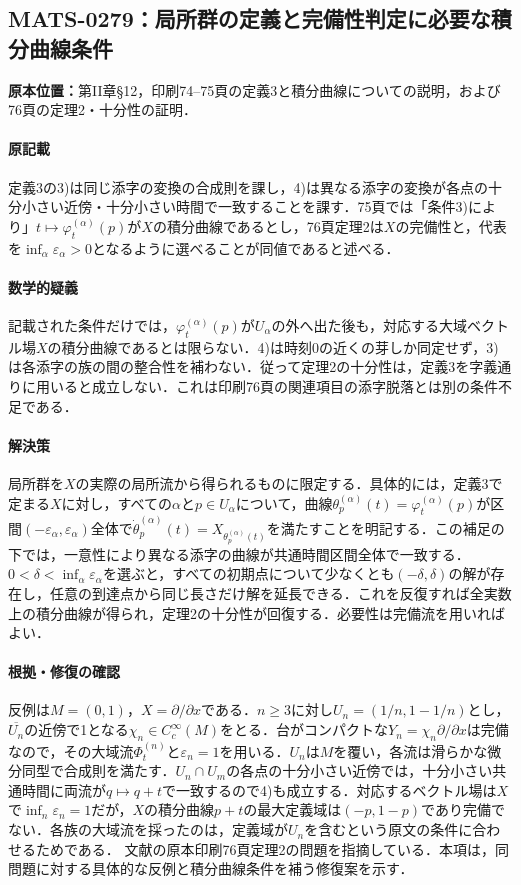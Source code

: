 \documentclass[a4paper,10pt]{ltjsarticle}
\begin{document}
\subsection*{MATS-0279：局所群の定義と完備性判定に必要な積分曲線条件}\label{math:MATS-0279}
\noindent\textbf{原本位置：}第II章\S12，印刷74--75頁の定義3と積分曲線についての説明，および76頁の定理2・十分性の証明．

\paragraph{原記載}定義3の3)は同じ添字の変換の合成則を課し，4)は異なる添字の変換が各点の十分小さい近傍・十分小さい時間で一致することを課す．75頁では「条件3)により」$t\mapsto\varphi_t^{(\alpha)}(p)$が$X$の積分曲線であるとし，76頁定理2は$X$の完備性と，代表を$\inf_\alpha\varepsilon_\alpha>0$となるように選べることが同値であると述べる．

\paragraph{数学的疑義}記載された条件だけでは，$\varphi_t^{(\alpha)}(p)$が$U_\alpha$の外へ出た後も，対応する大域ベクトル場$X$の積分曲線であるとは限らない．4)は時刻0の近くの芽しか同定せず，3)は各添字の族の間の整合性を補わない．従って定理2の十分性は，定義3を字義通りに用いると成立しない．これは印刷76頁の関連項目の添字脱落とは別の条件不足である．

\paragraph{解決策}局所群を$X$の実際の局所流から得られるものに限定する．具体的には，定義3で定まる$X$に対し，すべての$\alpha$と$p\in U_\alpha$について，曲線$\theta_p^{(\alpha)}(t)=\varphi_t^{(\alpha)}(p)$が区間$(-\varepsilon_\alpha,\varepsilon_\alpha)$全体で$\dot\theta_p^{(\alpha)}(t)=X_{\theta_p^{(\alpha)}(t)}$を満たすことを明記する．この補足の下では，一意性により異なる添字の曲線が共通時間区間全体で一致する．$0<\delta<\inf_\alpha\varepsilon_\alpha$を選ぶと，すべての初期点について少なくとも$(-\delta,\delta)$の解が存在し，任意の到達点から同じ長さだけ解を延長できる．これを反復すれば全実数上の積分曲線が得られ，定理2の十分性が回復する．必要性は完備流を用いればよい．

\paragraph{根拠・修復の確認}反例は$M=(0,1)$，$X=\partial/\partial x$である．$n\ge3$に対し$U_n=(1/n,1-1/n)$とし，$\overline{U_n}$の近傍で1となる$\chi_n\in C_c^\infty(M)$をとる．台がコンパクトな$Y_n=\chi_n\partial/\partial x$は完備なので，その大域流$\Phi_t^{(n)}$と$\varepsilon_n=1$を用いる．$U_n$は$M$を覆い，各流は滑らかな微分同型で合成則を満たす．$U_n\cap U_m$の各点の十分小さい近傍では，十分小さい共通時間に両流が$q\mapsto q+t$で一致するので4)も成立する．対応するベクトル場は$X$で$\inf_n\varepsilon_n=1$だが，$X$の積分曲線$p+t$の最大定義域は$(-p,1-p)$であり完備でない．各族の大域流を採ったのは，定義域が$U_n$を含むという原文の条件に合わせるためである． 文献\cite{paper2017}の原本印刷76頁定理2の問題を指摘している．本項は，同問題に対する具体的な反例と積分曲線条件を補う修復案を示す．
\end{document}
